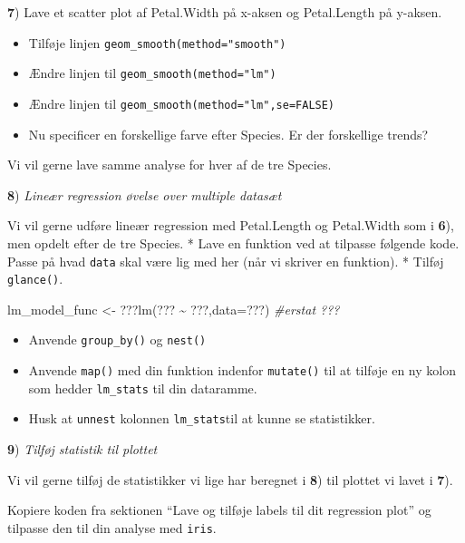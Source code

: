 \documentclass[
]{book}
\newenvironment{Shaded}{\begin{snugshade}}{\end{snugshade}}
\newcommand{\AttributeTok}[1]{\textcolor[rgb]{0.77,0.63,0.00}{#1}}
\newcommand{\CommentTok}[1]{\textcolor[rgb]{0.56,0.35,0.01}{\textit{#1}}}
\newcommand{\FunctionTok}[1]{\textcolor[rgb]{0.00,0.00,0.00}{#1}}
\newcommand{\NormalTok}[1]{#1}
\newcommand{\OtherTok}[1]{\textcolor[rgb]{0.56,0.35,0.01}{#1}}
\newcommand{\SpecialCharTok}[1]{\textcolor[rgb]{0.00,0.00,0.00}{#1}}
\providecommand{\tightlist}{%
  \setlength{\itemsep}{0pt}\setlength{\parskip}{0pt}}
\begin{document}
\textbf{7}) Lave et scatter plot af Petal.Width på x-aksen og Petal.Length på y-aksen.

\begin{itemize}
\tightlist
\item
  Tilføje linjen \texttt{geom\_smooth(method="smooth")}
\item
  Ændre linjen til \texttt{geom\_smooth(method="lm")}
\item
  Ændre linjen til \texttt{geom\_smooth(method="lm",se=FALSE)}
\item
  Nu specificer en forskellige farve efter Species. Er der forskellige trends?
\end{itemize}

Vi vil gerne lave samme analyse for hver af de tre Species.

\textbf{8}) \emph{Lineær regression øvelse over multiple datasæt}

Vi vil gerne udføre lineær regression med Petal.Length og Petal.Width som i \textbf{6}), men opdelt efter de tre Species.
* Lave en funktion ved at tilpasse følgende kode. Passe på hvad \texttt{data} skal være lig med her (når vi skriver en funktion).
* Tilføj \texttt{glance()}.

\begin{Shaded}
\begin{Highlighting}[]
\NormalTok{lm\_model\_func }\OtherTok{\textless{}{-}}\NormalTok{ ???}\FunctionTok{lm}\NormalTok{(??? }\SpecialCharTok{\textasciitilde{}}\NormalTok{ ???,}\AttributeTok{data=}\NormalTok{???) }\CommentTok{\#erstat ??? }
\end{Highlighting}
\end{Shaded}

\begin{itemize}
\tightlist
\item
  Anvende \texttt{group\_by()} og \texttt{nest()}
\item
  Anvende \texttt{map()} med din funktion indenfor \texttt{mutate()} til at tilføje en ny kolon som hedder \texttt{lm\_stats} til din dataramme.
\item
  Husk at \texttt{unnest} kolonnen \texttt{lm\_stats}til at kunne se statistikker.
\end{itemize}

\textbf{9}) \emph{Tilføj statistik til plottet}

Vi vil gerne tilføj de statistikker vi lige har beregnet i \textbf{8}) til plottet vi lavet i \textbf{7}).

Kopiere koden fra sektionen ``Lave og tilføje labels til dit regression plot'' og tilpasse den til din analyse med \texttt{iris}.
\end{document}
